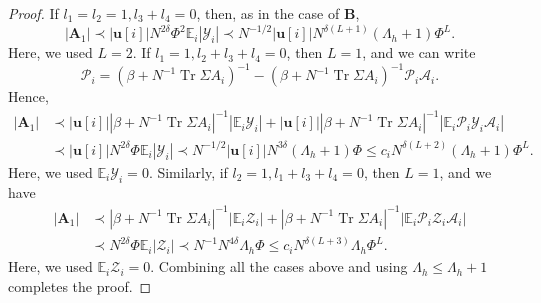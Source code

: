 \documentclass[10pt,a4paper]{amsart}
\def\E{\mathbb{E}}
\def\Tr{\operatorname{Tr}}
\def\cA{\mathcal{A}}
\def\cP{\mathcal{P}}
\def\cY{\mathcal{Y}}
\def\cZ{\mathcal{Z}}
\def\u{\mathbf{u}}
\begin{document}
\begin{proof}
If $l_1=l_2=1,l_3+l_4=0$, then, as in the case of $\mathbf{B}$,
\[
    |\mathbf{A}_1|\prec|\u[i]| N^{2\delta}\Phi^2\E_i|\cY_i|\prec N^{-1/2}|\u[i]|N^{\delta(L+1)}(\Lambda_h+1)\Phi^L.
\]
Here, we used $L=2$. If $l_1=1,l_2+l_3+l_4=0$, then $L=1$, and we can write
\[
    \cP_i=(\beta+N^{-1}\Tr\Sigma A_i)^{-1}-(\beta+N^{-1}\Tr\Sigma A_i)^{-1}\cP_i\cA_i.
\]
Hence,
\begin{align*}
    |\mathbf{A}_1|&\prec|\u[i]||\beta+N^{-1}\Tr\Sigma A_i|^{-1}|\E_i\cY_i|+|\u[i]||\beta+N^{-1}\Tr\Sigma A_i|^{-1}|\E_i\cP_i\cY_i\cA_i|\\
    &\prec |\u[i]|N^{2\delta}\Phi\E_i|\cY_i|\prec N^{-1/2}|\u[i]|N^{3\delta}(\Lambda_h+1)\Phi\leq c_i N^{\delta(L+2)}(\Lambda_h+1)\Phi^L.
\end{align*}
Here, we used $\E_i\cY_i=0$. Similarly, if $l_2=1,l_1+l_3+l_4=0$, then $L=1$, and we have
\begin{align*}
    |\mathbf{A}_1|&\prec |\beta+N^{-1}\Tr\Sigma A_i|^{-1}|\E_i\cZ_i|+|\beta+N^{-1}\Tr\Sigma A_i|^{-1}|\E_i\cP_i\cZ_i\cA_i|\\
    &\prec N^{2\delta}\Phi\E_i|\cZ_i|\prec N^{-1}N^{4\delta}\Lambda_h\Phi\leq c_i N^{\delta(L+3)}\Lambda_h\Phi^L.
\end{align*}
Here, we used $\E_i\cZ_i=0$. Combining all the cases above and using $\Lambda_h\leq\Lambda_h+1$ completes the proof.
\end{proof}
\end{document}
